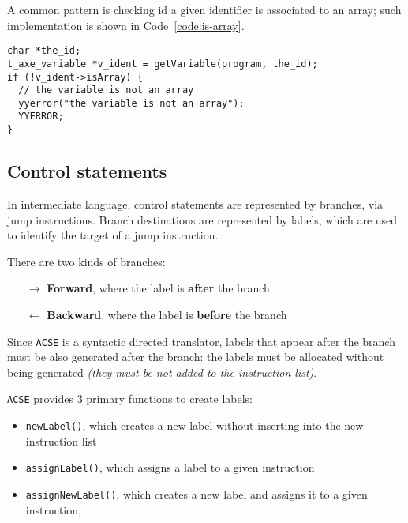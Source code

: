 A common pattern is checking id a given identifier is associated to an array;
such implementation is shown in Code~\ref{code:is-array}.

\begin{onepage}
  \begin{lstlisting}[language=LANCE, caption={Checking if a variable is an array}, label={code:is-array}]
char *the_id;
t_axe_variable *v_ident = getVariable(program, the_id);
if (!v_ident->isArray) {
  // the variable is not an array
  yyerror("the variable is not an array");
  YYERROR;
}
\end{lstlisting}
\end{onepage}

\subsection{Control statements}

In intermediate language, control statements are represented by branches, via jump instructions.
Branch destinations are represented by labels, which are used to identify the target of a jump instruction.

There are two kinds of branches:

\begin{itemize}
  \item[\(\rightarrow\)] \textbf{Forward}, where the label is \textbf{after} the branch
  \item[\(\leftarrow\)] \textbf{Backward}, where the label is \textbf{before} the branch
\end{itemize}

Since \texttt{ACSE} is a syntactic directed translator, labels that appear after the branch must be also generated after the branch:
the labels must be allocated without being generated \textit{(they must be not added to the instruction list)}.

\texttt{ACSE} provides \(3\) primary functions to create labels:

\begin{itemize}[label=\textbf{\texttt{>}}]
  \item \texttt{newLabel()}, which creates a new label without inserting into the new instruction list
  \item \texttt{assignLabel()}, which assigns a label to a given instruction
  \item \texttt{assignNewLabel()}, which creates a new label and assigns it to a given instruction,
\end{itemize}

